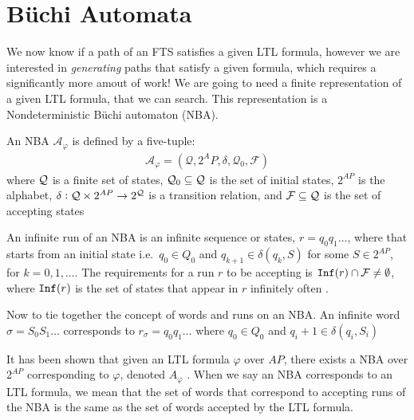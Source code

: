 \section{B\"{u}chi Automata}
We now know if a path of an FTS satisfies a given LTL formula, however we are interested in \textit{generating} paths that satisfy a given formula, which requires a significantly more amout of work! We are going to need a finite representation of a given LTL formula, that we can search. This representation is a Nondeterministic B\"{u}chi automaton (NBA). 
\begin{definition}
\label{defNBA}
An NBA $\mathcal{A}_\varphi$ is defined by a five-tuple:
\begin{align*}
\mathcal{A}_\varphi = (\mathcal{Q},2^AP,\delta,\mathcal{Q}_0,\mathcal{F})
\end{align*}
where $\mathcal{Q}$ is a finite set of states, $\mathcal{Q}_0 \subseteq \mathcal{Q}$ is the set of initial states, $2^{AP}$ is the alphabet, $\delta: \mathcal{Q} \times 2^{AP} \rightarrow 2^{\mathcal{Q}}$ is a transition relation, and $\mathcal{F} \subseteq \mathcal{Q}$ is the set of accepting states
\end{definition} 
An infinite run of an NBA is an infinite sequence or states, $r=q_0 q_1 \dots$, where that starts from an initial state i.e.\ $q_0 \in Q_0$ and $q_{k+1} \in \delta(q_k, S)$ for some $S \in 2^{AP}$, for $k = 0,1,\dots$. The requirements for a run $r$ to be accepting is $\texttt{Inf}(r) \cap \mathcal{F} \neq \emptyset$, where $\texttt{Inf}(r)$ is the set of states that appear in $r$ infinitely often \cite{guo15}. 

Now to tie together the concept of words and runs on an NBA. An infinite word $\sigma = S_0 S_1 \dots$ corresponds to $r_\sigma = q_0 q_1 \dots$ where $q_0 \in Q_0$ and $q_i+1 \in \delta(q_i,S_i)$

It has been shown that given an LTL formula $\varphi$ over $AP$, there exists a NBA over $2^{AP}$ corresponding to $\varphi$, denoted $A_\varphi$ \cite{baier08}. When we say an NBA corresponds to an LTL formula, we mean that the set of words that correspond to accepting runs of the NBA is the same as the set of words accepted by the LTL formula.  

